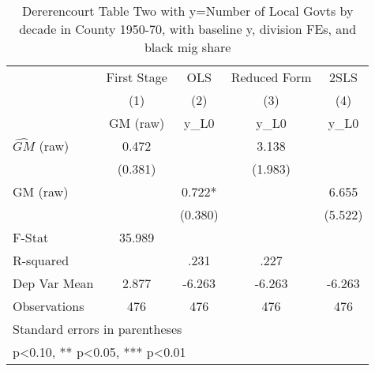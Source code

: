 \begin{table}[htbp]\centering
\def\sym#1{\ifmmode^{#1}\else\(^{#1}\)\fi}
\caption{Dererencourt Table Two with y=Number of Local Govts by decade in County 1950-70, with baseline y, division FEs, and black mig share}
\begin{tabular}{l*{4}{c}}
\toprule
                    & First Stage   &         OLS   &Reduced Form   &        2SLS   \\
                    &\multicolumn{1}{c}{(1)}&\multicolumn{1}{c}{(2)}&\multicolumn{1}{c}{(3)}&\multicolumn{1}{c}{(4)}\\
                    &\multicolumn{1}{c}{GM  (raw)}&\multicolumn{1}{c}{y\_L0}&\multicolumn{1}{c}{y\_L0}&\multicolumn{1}{c}{y\_L0}\\
\midrule
$\hat{GM}$ (raw)    &       0.472   &               &       3.138   &               \\
                    &     (0.381)   &               &     (1.983)   &               \\
\addlinespace
GM  (raw)           &               &       0.722*  &               &       6.655   \\
                    &               &     (0.380)   &               &     (5.522)   \\
\midrule
F-Stat              &      35.989   &               &               &               \\
R-squared           &               &        .231   &        .227   &               \\
Dep Var Mean        &       2.877   &      -6.263   &      -6.263   &      -6.263   \\
Observations        &         476   &         476   &         476   &         476   \\
\bottomrule
\multicolumn{5}{l}{\footnotesize Standard errors in parentheses}\\
\multicolumn{5}{l}{\footnotesize * p<0.10, ** p<0.05, *** p<0.01}\\
\end{tabular}
\end{table}
